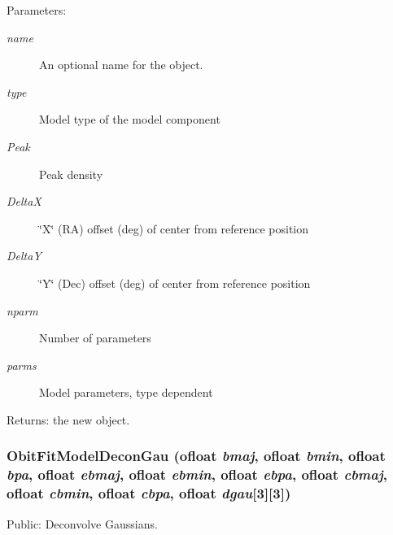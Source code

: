 \begin{Desc}
\item[Parameters:]
\begin{description}
\item[{\em name}]An optional name for the object. \item[{\em type}]Model type of the model component \item[{\em Peak}]Peak density \item[{\em Delta\-X}]\char`\"{}X\char`\"{} (RA) offset (deg) of center from reference position \item[{\em Delta\-Y}]\char`\"{}Y\char`\"{} (Dec) offset (deg) of center from reference position \item[{\em nparm}]Number of parameters \item[{\em parms}]Model parameters, type dependent \end{description}
\end{Desc}
\begin{Desc}
\item[Returns:]the new object. \end{Desc}
\subsubsection{ Obit\-Fit\-Model\-Decon\-Gau ({\bf ofloat} {\em bmaj}, {\bf ofloat} {\em bmin}, {\bf ofloat} {\em bpa}, {\bf ofloat} {\em ebmaj}, {\bf ofloat} {\em ebmin}, {\bf ofloat} {\em ebpa}, {\bf ofloat} {\em cbmaj}, {\bf ofloat} {\em cbmin}, {\bf ofloat} {\em cbpa}, {\bf ofloat} {\em dgau}[3][3])}\label{ObitFitModel_8h_a16}


Public: Deconvolve Gaussians. 

